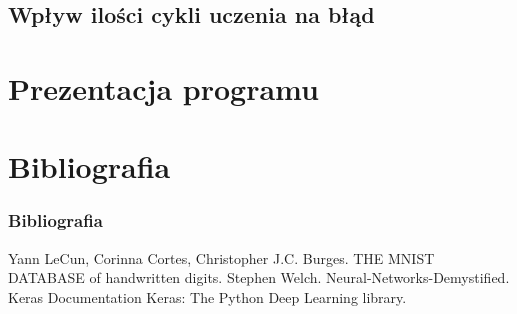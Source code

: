 \documentclass{beamer}
\begin{document}
\subsection{Wpływ ilości cykli uczenia na błąd}
\section{Prezentacja programu}

\section{Bibliografia}
\begin{frame}[allowframebreaks]

 \frametitle{Bibliografia}
 \begin{thebibliography}{10}
 \beamertemplatearticlebibitems
 Yann LeCun, Corinna Cortes, Christopher J.C. Burges.
 \newblock THE MNIST DATABASE of handwritten digits.
 \beamertemplatearticlebibitems
   Stephen Welch.
   \newblock Neural-Networks-Demystified.
   \beamertemplatearticlebibitems
   Keras Documentation
   \newblock Keras: The Python Deep Learning library.
 
 \end{thebibliography}
 \end{frame}
\end{document}
